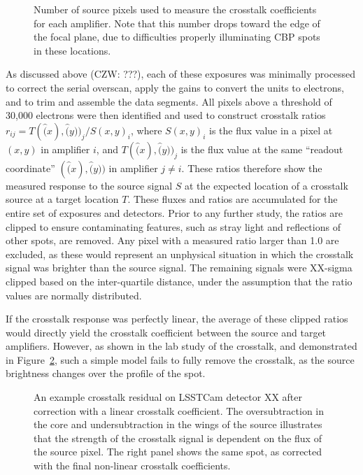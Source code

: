 \begin{figure}[t]
    \centering
    \caption{Number of source pixels used to measure the crosstalk coefficients for each amplifier.
      Note that this number drops toward the edge of the focal plane, due to difficulties properly illuminating CBP spots in these locations.}
    \label{fig:crosstalk-source-pixels}
\end{figure}

As discussed above (CZW: ???), each of these exposures was minimally processed to correct the serial overscan, apply the gains to convert the units to electrons, and to trim and assemble the data segments.
All pixels above a threshold of 30,000 electrons were then identified and used to construct crosstalk ratios $r_{ij} = T(\hat(x), \hat(y))_j / S(x, y)_i$, where $S(x, y)_i$ is the flux value in a pixel at $(x, y)$ in amplifier $i$, and $T(\hat(x), \hat(y))_j$ is the flux value at the same ``readout coordinate'' $(\hat(x), \hat(y))$ in amplifier $j \ne i$.
These ratios therefore show the measured response to the source signal $S$ at the expected location of a crosstalk source at a target location $T$.
These fluxes and ratios are accumulated for the entire set of exposures and detectors.
Prior to any further study, the ratios are clipped to ensure contaminating features, such as stray light and reflections of other spots, are removed.
Any pixel with a measured ratio larger than 1.0 are excluded, as these would represent an unphysical situation in which the crosstalk signal was brighter than the source signal.
The remaining signals were XX-sigma clipped based on the inter-quartile distance, under the assumption that the ratio values are normally distributed.

If the crosstalk response was perfectly linear, the average of these clipped ratios would directly yield the crosstalk coefficient between the source and target amplifiers.
However, as shown in the lab study of the crosstalk, and demonstrated in Figure~\ref{fig:crosstalk-linear-nonlinear-fit}, such a simple model fails to fully remove the crosstalk, as the source brightness changes over the profile of the spot.

\begin{figure}[t]
    \centering
    \caption{An example crosstalk residual on LSSTCam detector XX after correction with a linear crosstalk coefficient.
      The oversubtraction in the core and undersubtraction in the wings of the source illustrates that the strength of the crosstalk signal is dependent on the flux of the source pixel.
      The right panel shows the same spot, as corrected with the final non-linear crosstalk coefficients.}
    \label{fig:crosstalk-linear-nonlinear-fit}
\end{figure}

